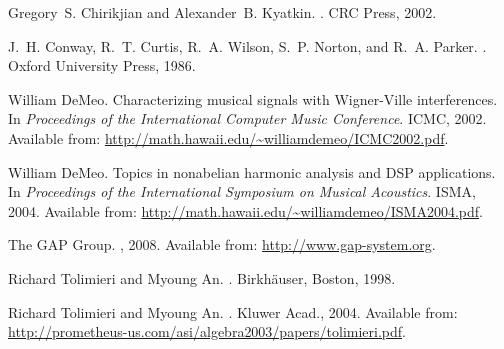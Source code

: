 \documentclass[10pt]{article}
\begin{document}


\def\cprime{$'$} \def\cprime{$'$}
  \def\ocirc#1{\ifmmode\setbox0=\hbox{$#1$}\dimen0=\ht0 \advance\dimen0
  by1pt\rlap{\hbox to\wd0{\hss\raise\dimen0
  \hbox{\hskip.2em$\scriptscriptstyle\circ$}\hss}}#1\else {\accent"17 #1}\fi}
\begin{thebibliography}{1}

Gregory~S. Chirikjian and Alexander~B. Kyatkin.
.
\newblock CRC Press, 2002.

J.~H. Conway, R.~T. Curtis, R.~A. Wilson, S.~P. Norton, and R.~A. Parker.
.
\newblock Oxford University Press, 1986.

William DeMeo.
\newblock Characterizing musical signals with {W}igner-{V}ille interferences.
\newblock In {\em Proceedings of the International Computer Music Conference}.
  ICMC, 2002.
\newblock Available from:
  \url{http://math.hawaii.edu/~williamdemeo/ICMC2002.pdf}.

William DeMeo.
\newblock Topics in nonabelian harmonic analysis and {DSP} applications.
\newblock In {\em Proceedings of the International Symposium on Musical
  Acoustics}. ISMA, 2004.
\newblock Available from:
  \url{http://math.hawaii.edu/~williamdemeo/ISMA2004.pdf}.

The GAP Group.
,
  2008.
\newblock Available from: \url{http://www.gap-system.org}.

Richard Tolimieri and Myoung An.
.
\newblock Birkh\"{a}user, Boston, 1998.

Richard Tolimieri and Myoung An.
.
\newblock Kluwer Acad., 2004.
\newblock Available from:
  \url{http://prometheus-us.com/asi/algebra2003/papers/tolimieri.pdf}.

\end{thebibliography}
\end{document}
